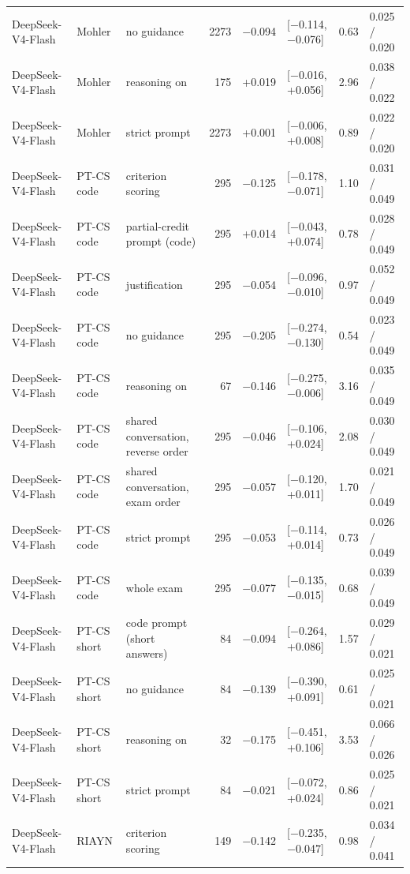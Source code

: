 \documentclass[10pt]{article}
\begin{document}
\begin{longtable}{ll>{\raggedright\arraybackslash}p{3.1cm}rrlrl}
DeepSeek-V4-Flash & Mohler & no guidance & 2273 & $-$0.094 & [$-$0.114, $-$0.076] & 0.63 & 0.025 / 0.020 \\
DeepSeek-V4-Flash & Mohler & reasoning on & 175 & +0.019 & [$-$0.016, +0.056] & 2.96 & 0.038 / 0.022 \\
DeepSeek-V4-Flash & Mohler & strict prompt & 2273 & +0.001 & [$-$0.006, +0.008] & 0.89 & 0.022 / 0.020 \\
DeepSeek-V4-Flash & PT-CS code & criterion scoring & 295 & $-$0.125 & [$-$0.178, $-$0.071] & 1.10 & 0.031 / 0.049 \\
DeepSeek-V4-Flash & PT-CS code & partial-credit prompt (code) & 295 & +0.014 & [$-$0.043, +0.074] & 0.78 & 0.028 / 0.049 \\
DeepSeek-V4-Flash & PT-CS code & justification & 295 & $-$0.054 & [$-$0.096, $-$0.010] & 0.97 & 0.052 / 0.049 \\
DeepSeek-V4-Flash & PT-CS code & no guidance & 295 & $-$0.205 & [$-$0.274, $-$0.130] & 0.54 & 0.023 / 0.049 \\
DeepSeek-V4-Flash & PT-CS code & reasoning on & 67 & $-$0.146 & [$-$0.275, $-$0.006] & 3.16 & 0.035 / 0.049 \\
DeepSeek-V4-Flash & PT-CS code & shared conversation, reverse order & 295 & $-$0.046 & [$-$0.106, +0.024] & 2.08 & 0.030 / 0.049 \\
DeepSeek-V4-Flash & PT-CS code & shared conversation, exam order & 295 & $-$0.057 & [$-$0.120, +0.011] & 1.70 & 0.021 / 0.049 \\
DeepSeek-V4-Flash & PT-CS code & strict prompt & 295 & $-$0.053 & [$-$0.114, +0.014] & 0.73 & 0.026 / 0.049 \\
DeepSeek-V4-Flash & PT-CS code & whole exam & 295 & $-$0.077 & [$-$0.135, $-$0.015] & 0.68 & 0.039 / 0.049 \\
DeepSeek-V4-Flash & PT-CS short & code prompt (short answers) & 84 & $-$0.094 & [$-$0.264, +0.086] & 1.57 & 0.029 / 0.021 \\
DeepSeek-V4-Flash & PT-CS short & no guidance & 84 & $-$0.139 & [$-$0.390, +0.091] & 0.61 & 0.025 / 0.021 \\
DeepSeek-V4-Flash & PT-CS short & reasoning on & 32 & $-$0.175 & [$-$0.451, +0.106] & 3.53 & 0.066 / 0.026 \\
DeepSeek-V4-Flash & PT-CS short & strict prompt & 84 & $-$0.021 & [$-$0.072, +0.024] & 0.86 & 0.025 / 0.021 \\
DeepSeek-V4-Flash & RIAYN & criterion scoring & 149 & $-$0.142 & [$-$0.235, $-$0.047] & 0.98 & 0.034 / 0.041 \\

\end{longtable}
\end{document}
